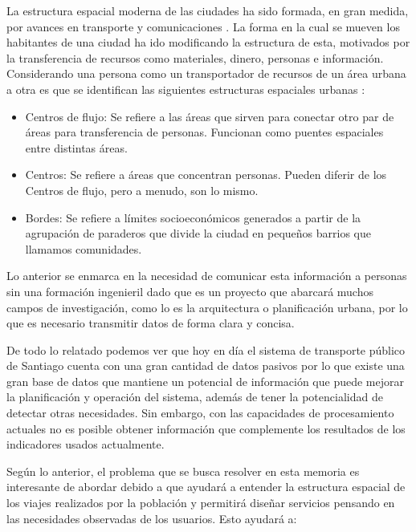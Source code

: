 \documentclass[itshape,12pt]{article}
\begin{document}
              La estructura espacial moderna de las ciudades ha sido formada, en gran medida, por avances en transporte y comunicaciones \cite{Forma_ciudad_moderna}. La forma en la cual se mueven los habitantes de una ciudad ha ido modificando la estructura de esta, motivados por la transferencia de recursos como materiales, dinero, personas e información. Considerando una persona como un transportador de recursos de un área urbana a otra es que se identifican las siguientes estructuras espaciales urbanas \cite{Estructura_urbana}:

              \begin{itemize}
          \item Centros de flujo: Se refiere a las áreas que sirven para conectar otro par de áreas para transferencia de personas. Funcionan como puentes espaciales entre distintas áreas.
              \item Centros: Se refiere a áreas que concentran personas. Pueden diferir de los Centros de flujo, pero a menudo, son lo mismo.
              \item Bordes: Se refiere a límites socioeconómicos generados a partir de la agrupación de paraderos que divide la ciudad en pequeños barrios que llamamos comunidades.
              \end{itemize}


              Lo anterior se enmarca en la necesidad de comunicar esta información a personas sin una formación ingenieril dado que es un proyecto que abarcará muchos campos de investigación, como lo es la arquitectura o planificación urbana, por lo que es necesario transmitir datos de forma clara y concisa.

              De todo lo relatado podemos ver que hoy en día el sistema de transporte público de Santiago cuenta con una gran cantidad de datos pasivos por lo que existe una gran base de datos que mantiene un potencial de información que puede mejorar la planificación y operación del sistema, además de tener la potencialidad de detectar otras necesidades. Sin embargo, con las capacidades de procesamiento actuales no es posible obtener información que complemente los resultados de los indicadores usados actualmente.

              Según lo anterior, el problema que se busca resolver en esta memoria es interesante de abordar debido a que ayudará a entender la estructura espacial de los viajes realizados por la población y permitirá diseñar servicios pensando en las necesidades observadas de los usuarios. Esto ayudará a:
\end{document}
